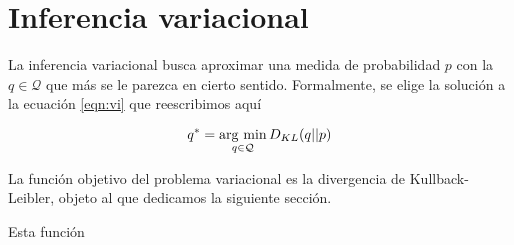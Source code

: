 \documentclass[main.tex]{subfiles}
\begin{document}
\chapter{Inferencia variacional}
La inferencia variacional busca aproximar una medida de probabilidad $p$ con la $q\in\mathcal{Q}$ que más se le parezca en cierto sentido. Formalmente, se elige la solución a la ecuación \eqref{eqn:vi} que reescribimos aquí

\begin{equation*}
	q^* = \operatorname*{arg\,\min}_{q \in \mathcal{Q}} D_{KL}(q||p)
\end{equation*}

La función objetivo del problema variacional es la divergencia de Kullback-Leibler, objeto al que dedicamos la siguiente sección. 

Esta función 
\end{document}
